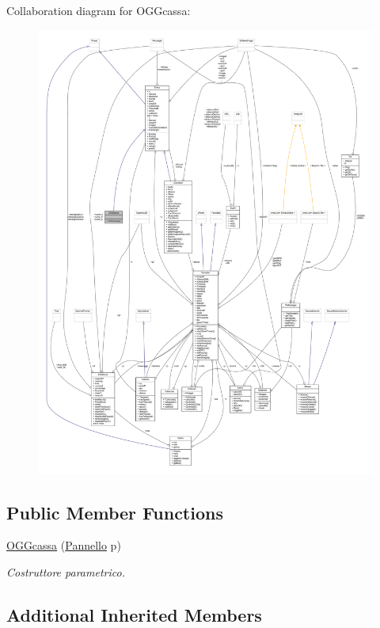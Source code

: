 Collaboration diagram for O\+G\+Gcassa\+:
\nopagebreak
\begin{figure}[H]
\begin{center}
\leavevmode
\includegraphics[width=350pt]{classoggetti_1_1_o_g_gcassa__coll__graph}
\end{center}
\end{figure}
\subsection*{Public Member Functions}
\begin{DoxyCompactItemize}
\item 
\hyperlink{classoggetti_1_1_o_g_gcassa_a392992c0ff0bc4643c39ed9485ef91fa}{O\+G\+Gcassa} (\hyperlink{classa_1_1survival_1_1game_1_1_pannello}{Pannello} p)
\begin{DoxyCompactList}\small\item\em Costruttore parametrico. \end{DoxyCompactList}\end{DoxyCompactItemize}
\subsection*{Additional Inherited Members}


